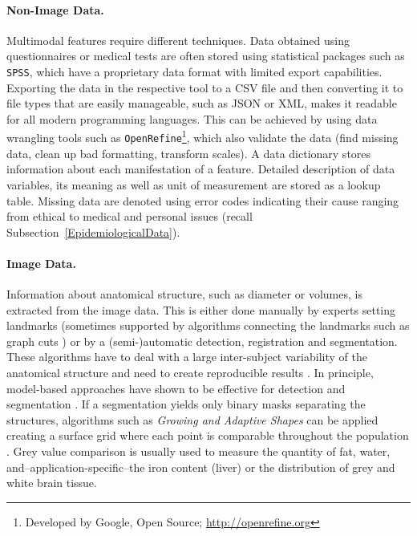 \documentclass[journal]{style/vgtc} 			          %
\begin{document}
\paragraph{Non-Image Data. }
%
Multimodal features require different techniques.
%
Data obtained using questionnaires or medical tests are often stored using statistical packages such as \texttt{SPSS}, which have a proprietary data format with limited export capabilities.
%
Exporting the data in the respective tool to a CSV file and then converting it to file types that are easily manageable, such as JSON or XML, makes it readable for all modern programming languages.
%
This can be achieved by using data wrangling tools such as \texttt{OpenRefine}\footnote{Developed by Google, Open Source; \url{http://openrefine.org}}, which also validate the data (find missing data, clean up bad formatting, transform scales).
%
A data dictionary stores information about each manifestation of a feature.
%
Detailed description of data variables, its meaning as well as unit of measurement are stored as a lookup table.
%
Missing data are denoted using error codes indicating their cause ranging from ethical to medical and personal issues (recall Subsection~\ref{EpidemiologicalData}).
%
\paragraph{Image Data. }
Information about anatomical structure, such as diameter or volumes, is extracted from the image data.
%
This is either done manually by experts setting landmarks (sometimes supported by algorithms connecting the landmarks such as graph cuts \cite{GraphCut}) or by a (semi-)automatic detection, registration and segmentation.
%
These algorithms have to deal with a large inter-subject variability of the anatomical structure and need to create reproducible results \cite{Preim2014}.
%
In principle, model-based approaches have shown to be effective for detection \cite{Rak2013} and segmentation \cite{Gloger2010, Gloger2012}.
%
If a segmentation yields only binary masks separating the structures, algorithms such as \emph{Growing and Adaptive Shapes} can be applied creating a surface grid where each point is comparable throughout the population \cite{Ferrarini2007}.
%
Grey value comparison is usually used to measure the quantity of fat, water, and--application-specific--the iron content (liver) or the distribution of grey and white brain tissue.
\end{document}

